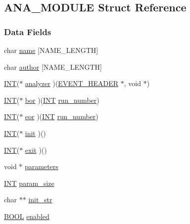 \subsection{ANA\_\-MODULE Struct Reference}
\label{structANA__MODULE}
\subsubsection*{Data Fields}
\begin{DoxyCompactItemize}
\item 
char \hyperlink{structANA__MODULE_a2d2f552fa5363f29a073f6e474e2f4f2}{name} \mbox{[}NAME\_\-LENGTH\mbox{]}
\item 
char \hyperlink{structANA__MODULE_a870b8ee21be70063bc382c911b5f21d6}{author} \mbox{[}NAME\_\-LENGTH\mbox{]}
\item 
\hyperlink{vppg_8h_a392e62da233ed3e2f7c3fd4f487a3896}{INT}($\ast$ \hyperlink{structANA__MODULE_af3d6511a274c1946ce0bf45e7000e756}{analyzer} )(\hyperlink{structEVENT__HEADER}{EVENT\_\-HEADER} $\ast$, void $\ast$)
\item 
\hyperlink{vppg_8h_a392e62da233ed3e2f7c3fd4f487a3896}{INT}($\ast$ \hyperlink{structANA__MODULE_a288a69852e0bcf07f90f4f344c42801b}{bor} )(\hyperlink{vppg_8h_a392e62da233ed3e2f7c3fd4f487a3896}{INT} \hyperlink{mevb_8c_a16695ea2bfd19f294afe066d6007ab36}{run\_\-number})
\item 
\hyperlink{vppg_8h_a392e62da233ed3e2f7c3fd4f487a3896}{INT}($\ast$ \hyperlink{structANA__MODULE_ab6b3f976d916f185922ed4ccfe6453c6}{eor} )(\hyperlink{vppg_8h_a392e62da233ed3e2f7c3fd4f487a3896}{INT} \hyperlink{mevb_8c_a16695ea2bfd19f294afe066d6007ab36}{run\_\-number})
\item 
\hyperlink{vppg_8h_a392e62da233ed3e2f7c3fd4f487a3896}{INT}($\ast$ \hyperlink{structANA__MODULE_a8ae1120805260da00f37f34ed6d519c5}{init} )()
\item 
\hyperlink{vppg_8h_a392e62da233ed3e2f7c3fd4f487a3896}{INT}($\ast$ \hyperlink{structANA__MODULE_af3b4cc4d6a12a8eadeea80d82866b780}{exit} )()
\item 
void $\ast$ \hyperlink{structANA__MODULE_afebe80244b239178fbb56c656b7520fc}{parameters}
\item 
\hyperlink{vppg_8h_a392e62da233ed3e2f7c3fd4f487a3896}{INT} \hyperlink{structANA__MODULE_a7402c042e2f62ed82d997f74bcc28251}{param\_\-size}
\item 
char $\ast$$\ast$ \hyperlink{structANA__MODULE_a4b8d333bfed34726eca0311247b0ad4e}{init\_\-str}
\item 
\hyperlink{vt2_8h_a239c7f0d40651c3e419c5b9651507d14}{BOOL} \hyperlink{structANA__MODULE_a0d86abcfd4f421658176e51c24f7eb29}{enabled}
\end{DoxyCompactItemize}


